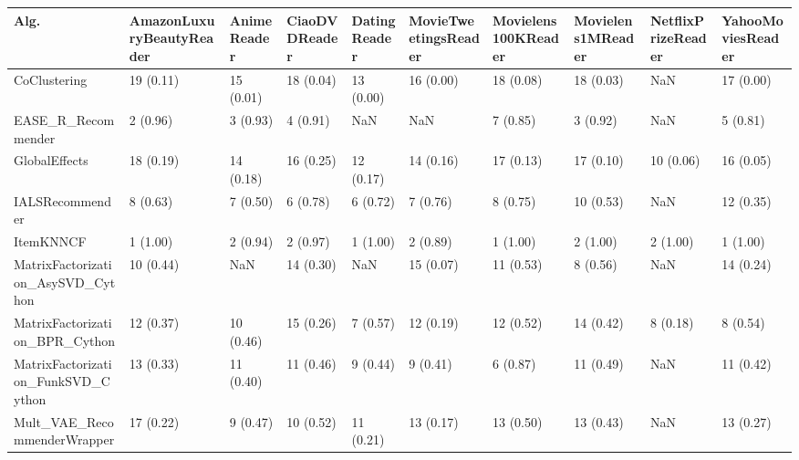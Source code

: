 \begin{tabular}{llllllllll}
\toprule
                               Alg. & AmazonLuxuryBeautyReader & AnimeReader & CiaoDVDReader & DatingReader & MovieTweetingsReader & Movielens100KReader & Movielens1MReader & NetflixPrizeReader & YahooMoviesReader \\
\midrule
                       CoClustering &                19 (0.11) &   15 (0.01) &     18 (0.04) &    13 (0.00) &            16 (0.00) &           18 (0.08) &         18 (0.03) &                NaN &         17 (0.00) \\
                 EASE\_R\_Recommender &                 2 (0.96) &    3 (0.93) &      4 (0.91) &          NaN &                  NaN &            7 (0.85) &          3 (0.92) &                NaN &          5 (0.81) \\
                      GlobalEffects &                18 (0.19) &   14 (0.18) &     16 (0.25) &    12 (0.17) &            14 (0.16) &           17 (0.13) &         17 (0.10) &          10 (0.06) &         16 (0.05) \\
                    IALSRecommender &                 8 (0.63) &    7 (0.50) &      6 (0.78) &     6 (0.72) &             7 (0.76) &            8 (0.75) &         10 (0.53) &                NaN &         12 (0.35) \\
                          ItemKNNCF &                 1 (1.00) &    2 (0.94) &      2 (0.97) &     1 (1.00) &             2 (0.89) &            1 (1.00) &          2 (1.00) &           2 (1.00) &          1 (1.00) \\
  MatrixFactorization\_AsySVD\_Cython &                10 (0.44) &         NaN &     14 (0.30) &          NaN &            15 (0.07) &           11 (0.53) &          8 (0.56) &                NaN &         14 (0.24) \\
     MatrixFactorization\_BPR\_Cython &                12 (0.37) &   10 (0.46) &     15 (0.26) &     7 (0.57) &            12 (0.19) &           12 (0.52) &         14 (0.42) &           8 (0.18) &          8 (0.54) \\
 MatrixFactorization\_FunkSVD\_Cython &                13 (0.33) &   11 (0.40) &     11 (0.46) &     9 (0.44) &             9 (0.41) &            6 (0.87) &         11 (0.49) &                NaN &         11 (0.42) \\
        Mult\_VAE\_RecommenderWrapper &                17 (0.22) &    9 (0.47) &     10 (0.52) &    11 (0.21) &            13 (0.17) &           13 (0.50) &         13 (0.43) &                NaN &         13 (0.27) \\

\end{tabular}
